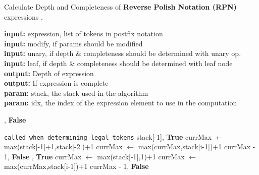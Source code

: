 \documentclass[runningheads]{llncs}
\begin{document}
\begin{algorithm}
\scriptsize
\caption{Calculate Depth and Completeness of \textbf{Reverse Polish Notation (RPN)} expressions \cite{77128902}.}
\label{alg:getRPNdepth_cache}
\hspace*{\algorithmicindent} \textbf{input:}  expression, list of tokens in postfix notation \\
\hspace*{\algorithmicindent} \textbf{input:}  modify, if params should be modified \\
\hspace*{\algorithmicindent} \textbf{input:}  unary, if depth \& completeness should be determined with unary op.  \\
\hspace*{\algorithmicindent} \textbf{input:} leaf, if depth \& completeness should be determined with leaf node \\
\hspace*{\algorithmicindent} \textbf{output:} Depth of expression\\
\hspace*{\algorithmicindent} \textbf{output:} If expression is complete \\
\hspace*{\algorithmicindent} \textbf{param:} stack, the stack used in the algorithm \\
\hspace*{\algorithmicindent} \textbf{param:} idx, the index of the expression element to use in the computation
\begin{algorithmic}[1]
        \State {}, \textbf{False}
    \EndIf

     \Comment\texttt{{called when determining legal tokens}}
                \State \Return stack[-1], \textbf{True}
            \Else
                \State currMax $\gets$ max(stack[-1]+1,stack[-2])+1
                    \State currMax $\gets$ max(currMax,stack[i-1])+1
                \EndFor
                \State \Return currMax - 1, \textbf{False}
            \EndIf
                \State {}, \textbf{True}
            \Else
                \State currMax $\gets$ max(stack[-1],1)+1
                    \State currMax $\gets$ max(currMax,stack[i-1])+1
                \EndFor
                \State \Return currMax - 1, \textbf{False}
            \EndIf
                

\end{algorithmic}
\end{algorithm}
\end{document}
